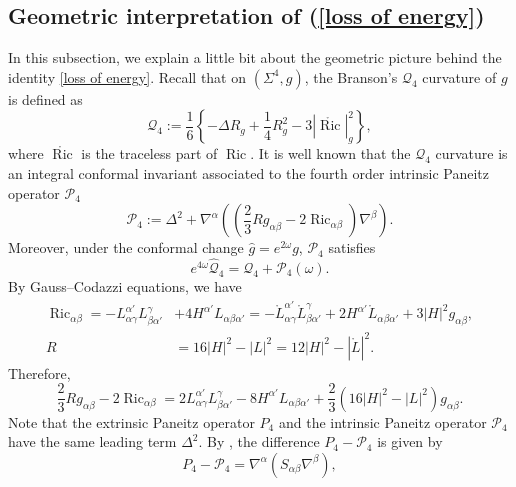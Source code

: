 \documentclass[11pt,letterpaper]{amsart}
\DeclareMathOperator{\Ric}{Ric}
\newcommand{\mP}{\mathcal{P}}
\newcommand{\mQ}{\mathcal{Q}}
\theoremstyle{definition}
\theoremstyle{remark}
\numberwithin{equation}{section}
\begin{document}
\subsection{Geometric interpretation of (\ref{loss of energy})}
In this subsection, we explain a little bit about the geometric picture behind the identity \ref{loss of energy}. Recall that on $(\Sigma^4, g)$, the Branson's $\mQ_4$ curvature of $g$ is defined as
\begin{equation*}
    \mQ_4:=\frac{1}{6}\left\{-\Delta R_g+\frac{1}{4}R^2_g-3|\mathring{\Ric}|_g^2\right\},
\end{equation*}
where $\mathring{\Ric}$ is the traceless part of $\Ric$. It is well known that the $\mQ_4$ curvature is an integral conformal invariant associated to the fourth order intrinsic Paneitz operator $\mP_4$
\begin{equation*}
    \mP_4:=\Delta^2+\nabla^{\alpha}\left(\left(\frac{2}{3}R g_{\alpha\beta}-2\Ric_{\alpha\beta}\right)\nabla^{\beta}\right).
\end{equation*}
Moreover, under the conformal change $\hat{g}=e^{2\omega}g$, $\mP_4$ satisfies
\begin{equation*}
e^{4\omega}\hat{\mQ}_4=\mQ_4+\mP_4\left(\omega\right).
\end{equation*}
By Gauss--Codazzi equations, we have
\begin{equation*}
    \begin{split}
        \Ric_{\alpha\beta}=-L^{\alpha'}_{\alpha\gamma}L^{\gamma}_{\beta\alpha'}&+4H^{\alpha'}L_{\alpha\beta\alpha'}=-\mathring{L}^{\alpha'}_{\alpha\gamma}\mathring{L}^{\gamma}_{\beta\alpha'}+2H^{\alpha'}\mathring{L}_{\alpha\beta\alpha'}+3|H|^2g_{\alpha\beta},\\
        R&=16|H|^2-|L|^2=12|H|^2-|\mathring{L}|^2.
    \end{split}
\end{equation*}
Therefore, 
\begin{equation*}
    \frac{2}{3}R g_{\alpha\beta}-2\Ric_{\alpha\beta}=2L^{\alpha'}_{\alpha\gamma}L^{\gamma}_{\beta\alpha'}-8H^{\alpha'}L_{\alpha\beta\alpha'}+\frac{2}{3} \left(16|H|^2-|L|^2\right)g_{\alpha\beta}.
\end{equation*}
Note that the extrinsic Paneitz operator $P_4$ and the intrinsic Paneitz operator $\mP_4$ have the same leading term $\Delta^2$. By \cite[Theorem 5.3]{Case-Graham-Kuo}, the difference $P_4-\mP_4$ is given by
\begin{equation*}
    P_4-\mP_4=\nabla^{\alpha}\left(S_{\alpha\beta}\nabla^{\beta}\right),
\end{equation*}
\end{document}

